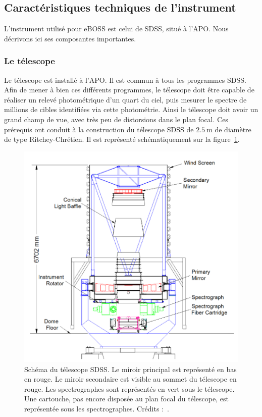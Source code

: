 \documentclass[11pt, twoside, a4paper, openright]{report}
\begin{document}
\subsection{Caractéristiques techniques de l'instrument}
L'instrument \autocite{Gunn2006} utilisé pour eBOSS est celui de SDSS, situé à l'APO. Nous décrivons ici ses composantes importantes.

\subsubsection{Le télescope}
Le télescope est installé à l'APO. Il est commun à tous les programmes SDSS. Afin de mener à bien ces différents programmes, le télescope doit être capable de réaliser un relevé photométrique d'un quart du ciel, puis mesurer le spectre de millions de cibles identifiées via cette photométrie. Ainsi le télescope doit avoir un grand champ de vue, avec très peu de distorsions dans le plan focal. Ces prérequis ont conduit à la construction du télescope SDSS de $\SI{2,5}{\meter}$ de diamètre de type Ritchey-Chrétien. Il est représenté schématiquement sur la figure~\ref{fig:SchemaTelescope}. \\
\begin{figure}
  \centering
  \includegraphics[scale=0.5]{SchemaTelescope}
  \caption{Schéma du télescope SDSS. Le miroir principal est représenté en bas en rouge. Le miroir secondaire est visible au sommet du télescope en rouge. Les spectrographes sont représentés en vert sous le télescope. Une cartouche, pas encore disposée au plan focal du télescope, est représentée sous les spectrographes. Crédits :~\textcite{Smee2012}.}
  \label{fig:SchemaTelescope}
\end{figure}
\end{document}
